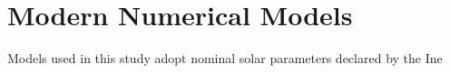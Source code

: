 \section{Modern Numerical Models}
Models used in this study adopt nominal solar parameters declared by the Ine